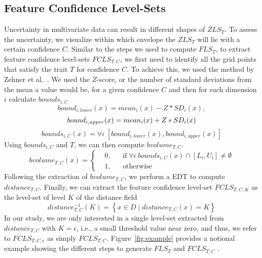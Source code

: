 \vspace{-2mm}
\subsection{Feature Confidence Level-Sets}
Uncertainty in multivariate data can result in different shapes of $ZLS_{T}$.
%
To assess the uncertainty, we visualize within which envelope the $ZLS_{T}$ will lie with a certain confidence $C$.
%
Similar to the steps we used to compute $FLS_{T}$, to extract feature confidence level-sets $FCLS_{T,C}$, we first need to identify all the grid points that satisfy the trait $T$ for confidence $C$.
%
To achieve this, we used the method by Zehner et al.~\cite{zehner2010visualization}. 
%
We used the $Z$-score, or the number of standard deviations from the mean a value would be, for a given confidence $C$ and then for each dimension $i$ calculate $bounds_{i,C}$
\begin{equation}
bound_{i,lower}(x) = mean_{i}(x) - Z*SD_{i}(x),
\end{equation}
\begin{equation}
bound_{i,upper}(x) = mean_{i}(x) + Z*SD_{i}(x)\\
\end{equation}
\begin{equation}
bounds_{i,C}(x) = \forall i \; [bound_{i, lower}(x), bound_{i,upper}(x)]
\end{equation}
%
Using $bounds_{i,C}$ and $T$, we can then compute $bvolume_{T,C}$.
\begin{equation}
  bvolume_{T,C}(x) = \left \{
  \begin{aligned}
    &0, && \text{if}\; \forall i\; bounds_{i, C}(x) \cap [L_{i}, U_{i}] \neq \emptyset \\
    &1, && \text{otherwise}
  \end{aligned} \right.
\end{equation}
%
Following the extraction of $bvolume_{T,C}$, we perform a EDT to compute $distance_{T,C}$.
%
Finally, we can extract the feature confidence level-set $FCLS_{T,C,K}$ as the level-set of level $K$ of the distance field
%
\begin{equation} 
distance_{T,C}^{-1}(K) = \left\{ x \in D\; |\; distance_{T,C}(x) = K\right\}
\end{equation}
%
In our study, we are only interested in a single level-set extracted from $distance_{T,C}$ with $K = \epsilon$, i.e., a small threshold value near zero, and thus, we refer to $FCLS_{T,C,\epsilon}$ as simply $FCLS_{T,C}$.
%
Figure~\ref{fig:example} provides a notional example showing the different steps to generate $FLS_{T}$ and $FCLS_{T,C}$ .
